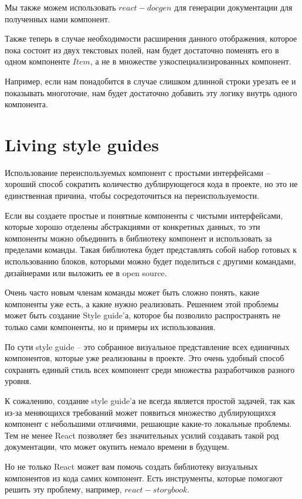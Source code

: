 Мы также можем использовать $react-docgen$ для генерации документации для полученных нами компонент.

Также теперь в случае необходимости расширения данного отображения, которое пока состоит из двух текстовых полей, нам будет достаточно поменять его в одном компоненте $Item$, а не в множестве узкоспециализированных компонент.

Например, если нам понадобится в случае слишком длинной строки урезать ее и показывать многоточие, нам будет достаточно добавить эту логику внутрь одного компонента.

\section{Living style guides}

Использование переиспользуемых компонент с простыми интерфейсами -- хороший способ сократить количество дублирующегося кода в проекте, но это не единственная причина, чтобы сосредоточиться на переиспользуемости.

Если вы создаете простые и понятные компоненты с чистыми интерфейсами, которые хорошо отделены абстракциями от конкретных данных, то эти компоненты можно объединить в библиотеку компонент и использовать за пределами команды. Такая библиотека будет представлять собой набор готовых к использованию блоков, которыми можно будет поделиться с другими командами, дизайнерами или выложить ее в open source.

Очень часто новым членам команды может быть сложно понять, какие компоненты уже есть, а какие нужно реализовать. Решением этой проблемы может быть создание Style guide'а, которое бы позволило распространять не только сами компоненты, но и примеры их использования.

По сути style guide -- это собранное визуальное представление всех единичных компонентов, которые уже реализованы в проекте. Это очень удобный способ сохранять единый стиль всех компонент среди множества разработчиков разного уровня. 

К сожалению, создание style guide'а не всегда является простой задачей, так как из-за меняющихся требований может появиться множество дублирующихся компонент с небольшими отличиями, решающие какие-то локальные проблемы. Тем не менее React позволяет без значительных усилий создавать такой род документации, что может окупить немало времени в будущем.

Но не только React может вам помочь создать библиотеку визуальных компонентов из кода самих компонент. Есть инструменты, которые помогают решить эту проблему, например, $react-storybook$.

